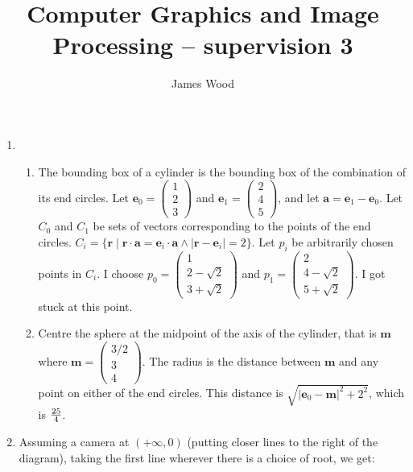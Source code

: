 \documentclass{article}
\begin{document}
\title{Computer Graphics and Image Processing -- supervision 3}
\author{James Wood}
\maketitle

\begin{enumerate}
  \item
    \begin{enumerate}
    \item The bounding box of a cylinder is the bounding box of the combination of its end circles. Let $\mathbf e_0 = \begin{pmatrix}1\\2\\3\end{pmatrix}$ and $\mathbf e_1 = \begin{pmatrix}2\\4\\5\end{pmatrix}$, and let $\mathbf a = \mathbf e_1 - \mathbf e_0$. Let $C_0$ and $C_1$ be sets of vectors corresponding to the points of the end circles. $C_i = \{\mathbf r \mid \mathbf r \cdot \mathbf a = \mathbf e_i \cdot \mathbf a \wedge \lvert \mathbf r - \mathbf e_i \rvert = 2\}$. Let $p_i$ be arbitrarily chosen points in $C_i$. I choose $p_0 = \begin{pmatrix}1\\2 - \sqrt 2\\3 + \sqrt 2\end{pmatrix}$ and $p_1 = \begin{pmatrix}2\\4 - \sqrt 2\\5 + \sqrt 2\end{pmatrix}$. I got stuck at this point.
    \item Centre the sphere at the midpoint of the axis of the cylinder, that is $\mathbf m$ where $\mathbf m = \begin{pmatrix}3/2\\3\\4\end{pmatrix}$. The radius is the distance between $\mathbf m$ and any point on either of the end circles. This distance is $\sqrt{\lvert \mathbf e_0 - \mathbf m \rvert^2 + 2^2}$, which is $25 \over 4$.
    \end{enumerate}
  \item Assuming a camera at $(+\infty,0)$ (putting closer lines to the right of the diagram), taking the first line wherever there is a choice of root, we get:


\end{enumerate}
\end{document}
